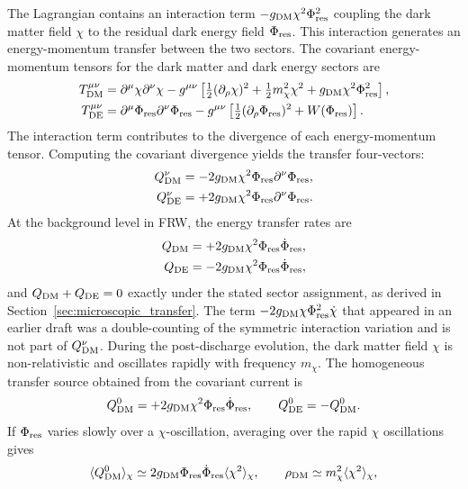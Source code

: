 \documentclass[epj]{svjour}
\begin{document}
The Lagrangian contains an interaction term
\(-g_{\rm DM}\chi^2\Phi_{\rm res}^2\) coupling the dark matter field
\(\chi\) to the residual dark energy field \(\Phi_{\rm res}\). This
interaction generates an energy-momentum transfer between the two
sectors. The covariant energy-momentum tensors for the dark matter
and dark energy sectors are
\begin{align}
T^{\mu\nu}_{\rm DM} &= \partial^\mu\chi\partial^\nu\chi
- g^{\mu\nu}\left[\tfrac12(\partial_\rho\chi)^2
+ \tfrac12 m_\chi^2\chi^2 + g_{\rm DM}\chi^2\Phi_{\rm res}^2\right], \\
T^{\mu\nu}_{\rm DE} &= \partial^\mu\Phi_{\rm res}\partial^\nu\Phi_{\rm res}
- g^{\mu\nu}\left[\tfrac12(\partial_\rho\Phi_{\rm res})^2
+ W(\Phi_{\rm res})\right].
\end{align}
The interaction term contributes to the divergence of each
energy-momentum tensor. Computing the covariant divergence yields
the transfer four-vectors:
\begin{align}
Q_{\rm DM}^\nu &= -2g_{\rm DM}\chi^2\Phi_{\rm res}\partial^\nu\Phi_{\rm res}, \\
Q_{\rm DE}^\nu &= +2g_{\rm DM}\chi^2\Phi_{\rm res}\partial^\nu\Phi_{\rm res}.
\end{align}
At the background level in FRW, the energy transfer rates are
\begin{align}
Q_{\rm DM} &= +2g_{\rm DM}\chi^2\Phi_{\rm res}\dot\Phi_{\rm res}, \\
Q_{\rm DE} &= -2g_{\rm DM}\chi^2\Phi_{\rm res}\dot\Phi_{\rm res},
\end{align}
and \(Q_{\rm DM}+Q_{\rm DE}=0\) exactly under the stated sector
assignment, as derived in Section~\ref{sec:microscopic_transfer}. The term
\(-2g_{\rm DM}\chi\Phi_{\rm res}^2\dot\chi\) that appeared in an
earlier draft was a double-counting of the symmetric interaction
variation and is not part of \(Q_{\rm DM}^\nu\). During the post-discharge
evolution, the dark matter field \(\chi\) is non-relativistic and
oscillates rapidly with frequency \(m_\chi\). The homogeneous
transfer source obtained from the covariant current is
\begin{equation}
Q_{\rm DM}^{0}
=+2g_{\rm DM}\chi^2\Phi_{\rm res}\dot\Phi_{\rm res},
\qquad Q_{\rm DE}^{0}=-Q_{\rm DM}^{0}.
\end{equation}
If \(\Phi_{\rm res}\) varies slowly over a \(\chi\)-oscillation,
averaging over the rapid \(\chi\) oscillations gives
\begin{equation}
\langle Q_{\rm DM}^{0}\rangle_\chi
\simeq 2g_{\rm DM}\Phi_{\rm res}\dot\Phi_{\rm res}
\langle\chi^2\rangle_\chi,
\qquad
\rho_{\rm DM}\simeq m_\chi^2
\langle\chi^2\rangle_\chi,
\end{equation}
\end{document}
